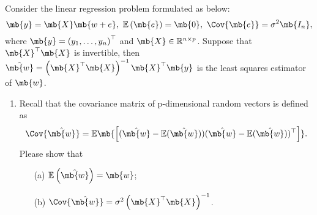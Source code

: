 \newpage
\begin{exercise}[Multicollinearity]
    Consider the linear regression problem formulated as below:
    $$\mb{y} = \mb{X} \mb{ w + e},\ \mathbb{E}\left(\mb{e}\right) = \mb{0},\ \Cov{\mb{e}} = \sigma^2 \mb{I_n}, $$where $\mb{y}=\left(y_{1}, \ldots, y_{n}\right)^{\top}$ and $\mb{X} \in \mathbb{R}^{n \times p}$. Suppose that $\mb{X}^{\top}\mb{X}$ is invertible, then $\hat{\mb{w}} = \left(\mb{X}^{\top} \mb{X}\right)^{-1} \mb{X}^{\top} \mb{y}$ is the least squares estimator of $\mb{w}$.
    \begin{enumerate}
        \item Recall that the covariance matrix of p-dimensional random vectors is defined as $$\Cov{\hat{\mb{w}}} = \mathbb{E}\mb{\left[(\hat{\mb{w}}-\mathbb{E}(\hat{\mb{w}}))(\hat{\mb{w}}-\mathbb{E}(\hat{\mb{w}}))^{\top}\right]}.$$
            Please show that
            \begin{enumerate}
                \item[(a)] $\mathbb{E}\left(\hat{\mb{w}}\right) = \mb{w}$;
                \item[(b)] $\Cov{\hat{\mb{w}}} = \sigma^2 \left(\mb{X}^{\top} \mb{X}\right)^{-1}$.
            \end{enumerate}
            

\end{enumerate}
\end{exercise}
